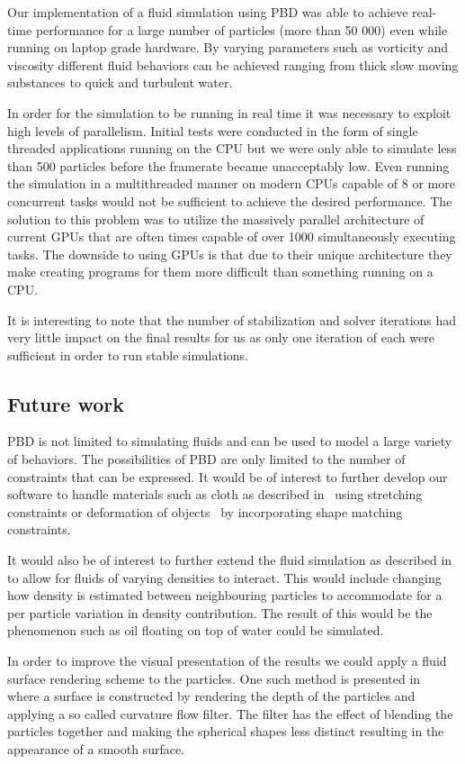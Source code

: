 Our implementation of a fluid simulation using PBD was able to achieve
real-time performance for a large number of particles (more than 50 000) even
while running on laptop grade hardware. By varying parameters such as vorticity
and viscosity different fluid behaviors can be achieved ranging from thick slow
moving substances to quick and turbulent water.

In order for the simulation to be running in real time it was necessary to
exploit high levels of parallelism. Initial tests were conducted in the form
of single threaded applications running on the CPU but we were only able to
simulate less than 500 particles before the framerate became unacceptably low.
Even running the simulation in a multithreaded manner on modern CPUs capable of
8 or more concurrent tasks would not be sufficient to achieve the desired
performance. The solution to this problem was to utilize the massively parallel
architecture of current GPUs that are often times
capable of over 1000 simultaneously executing tasks. The downside to using GPUs
is that due to their unique architecture they make creating programs for them
more difficult than something running on a CPU.

It is interesting to note that the number of stabilization and solver
iterations had very little impact on the final results for us as only one
iteration of each were sufficient in order to run stable simulations.

\subsection{Future work}
PBD is not limited to simulating
fluids and can be used to model a large variety of behaviors. The possibilities
of PBD are only limited to the number of constraints that
can be expressed. It would be of interest to further develop our software to
handle materials such as cloth as described in~\cite{muller2007position} using
stretching constraints or deformation of objects~\cite{muller2005meshless} by
incorporating shape matching constraints.

It would also be of interest to further extend the fluid simulation as
described in~\cite{macklin2014unified} to allow for fluids of varying densities
to interact. This would include changing how density is estimated between
neighbouring particles to accommodate for a per particle variation in density
contribution. The result of this would be the phenomenon such as oil floating
on top of water could be simulated.

In order to improve the visual presentation of the results we could apply a
fluid surface rendering scheme to the particles. One such method is presented
in~\cite{van2009screen} where a surface is constructed by rendering the depth
of the particles and applying a so called curvature flow filter. The filter has
the effect of blending the particles together and making the spherical shapes
less distinct resulting in the appearance of a smooth surface.
